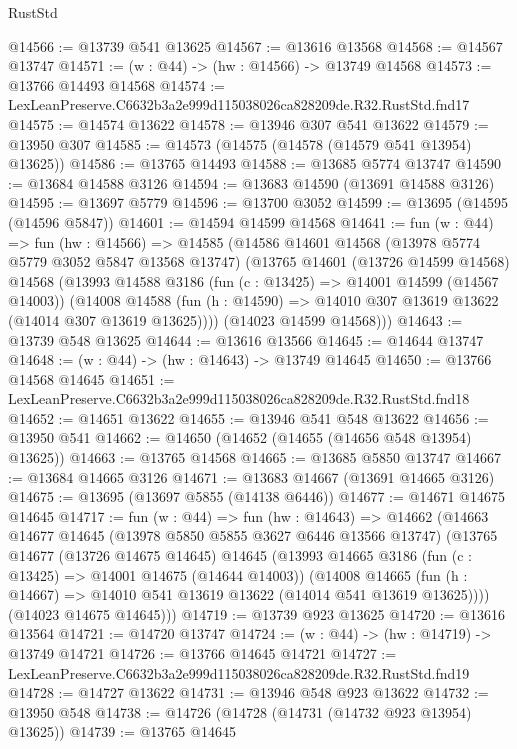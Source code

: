 \begin{lexlean}{RustStd}
\begin{coremodule}
@14566 := @13739 @541 @13625
@14567 := @13616 @13568
@14568 := @14567 @13747
@14571 := (w : @44) -> (hw : @14566) -> @13749 @14568
@14573 := @13766 @14493 @14568
@14574 := LexLeanPreserve.C6632b3a2e999d115038026ca828209de.R32.RustStd.fnd17
@14575 := @14574 @13622
@14578 := @13946 @307 @541 @13622
@14579 := @13950 @307
@14585 := @14573 (@14575 (@14578 (@14579 @541 @13954) @13625))
@14586 := @13765 @14493
@14588 := @13685 @5774 @13747
@14590 := @13684 @14588 @3126
@14594 := @13683 @14590 (@13691 @14588 @3126)
@14595 := @13697 @5779
@14596 := @13700 @3052
@14599 := @13695 (@14595 (@14596 @5847))
@14601 := @14594 @14599 @14568
@14641 := fun (w : @44) =>
  fun (hw : @14566) =>
  @14585
    (@14586
      @14601
      @14568
      (@13978 @5774 @5779 @3052 @5847 @13568 @13747)
      (@13765
        @14601
        (@13726 @14599 @14568)
        @14568
        (@13993
          @14588
          @3186
          (fun (c : @13425) => @14001 @14599 (@14567 @14003))
          (@14008
            @14588
            (fun (h : @14590) => @14010 @307 @13619 @13622 (@14014 @307 @13619 @13625))))
        (@14023 @14599 @14568)))
@14643 := @13739 @548 @13625
@14644 := @13616 @13566
@14645 := @14644 @13747
@14648 := (w : @44) -> (hw : @14643) -> @13749 @14645
@14650 := @13766 @14568 @14645
@14651 := LexLeanPreserve.C6632b3a2e999d115038026ca828209de.R32.RustStd.fnd18
@14652 := @14651 @13622
@14655 := @13946 @541 @548 @13622
@14656 := @13950 @541
@14662 := @14650 (@14652 (@14655 (@14656 @548 @13954) @13625))
@14663 := @13765 @14568
@14665 := @13685 @5850 @13747
@14667 := @13684 @14665 @3126
@14671 := @13683 @14667 (@13691 @14665 @3126)
@14675 := @13695 (@13697 @5855 (@14138 @6446))
@14677 := @14671 @14675 @14645
@14717 := fun (w : @44) =>
  fun (hw : @14643) =>
  @14662
    (@14663
      @14677
      @14645
      (@13978 @5850 @5855 @3627 @6446 @13566 @13747)
      (@13765
        @14677
        (@13726 @14675 @14645)
        @14645
        (@13993
          @14665
          @3186
          (fun (c : @13425) => @14001 @14675 (@14644 @14003))
          (@14008
            @14665
            (fun (h : @14667) => @14010 @541 @13619 @13622 (@14014 @541 @13619 @13625))))
        (@14023 @14675 @14645)))
@14719 := @13739 @923 @13625
@14720 := @13616 @13564
@14721 := @14720 @13747
@14724 := (w : @44) -> (hw : @14719) -> @13749 @14721
@14726 := @13766 @14645 @14721
@14727 := LexLeanPreserve.C6632b3a2e999d115038026ca828209de.R32.RustStd.fnd19
@14728 := @14727 @13622
@14731 := @13946 @548 @923 @13622
@14732 := @13950 @548
@14738 := @14726 (@14728 (@14731 (@14732 @923 @13954) @13625))
@14739 := @13765 @14645

\end{coremodule}
\end{lexlean}
